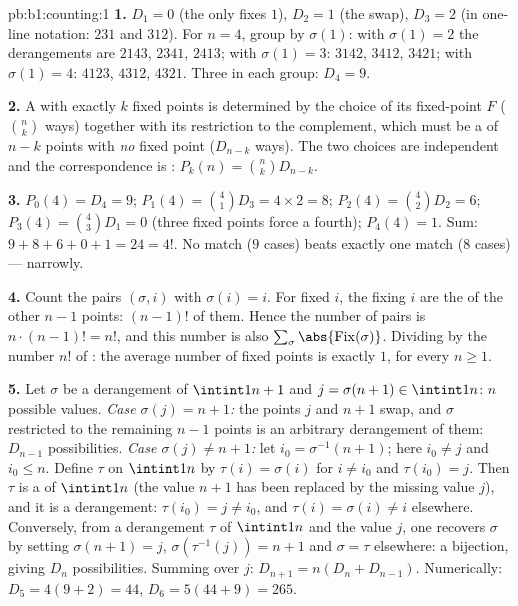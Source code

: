 \begin{solution}{pb:b1:counting:1}
\textbf{1.} $D_1 = 0$ (the only  fixes $1$), $D_2 = 1$
(the swap), $D_3 = 2$ (in one-line notation: $231$ and $312$). For
$n = 4$, group by $\sigma(1)$: with $\sigma(1) = 2$ the derangements
are $2143$, $2341$, $2413$; with $\sigma(1) = 3$: $3142$, $3412$,
$3421$; with $\sigma(1) = 4$: $4123$, $4312$, $4321$. Three in each
group: $D_4 = 9$.

\textbf{2.} A  with exactly $k$ fixed points is
determined by the choice of its fixed-point  $F$ ($\binom nk$
ways) together with its restriction to the complement, which must
be a  of $n - k$ points with \emph{no} fixed point
($D_{n-k}$ ways). The two choices are independent and the
correspondence is : $P_k(n) = \binom nk D_{n-k}$.

\textbf{3.} $P_0(4) = D_4 = 9$; $P_1(4) = \binom41 D_3 = 4 \times 2
= 8$; $P_2(4) = \binom42 D_2 = 6$; $P_3(4) = \binom43 D_1 = 0$
(three fixed points force a fourth); $P_4(4) = 1$. Sum: $9 + 8 + 6
+ 0 + 1 = 24 = 4!$. No match ($9$ cases) beats exactly one match
($8$ cases) --- narrowly.

\textbf{4.} Count the pairs $(\sigma, i)$ with $\sigma(i) = i$. For
fixed $i$, the  fixing $i$ are the  of the
other $n - 1$ points: $(n-1)!$ of them. Hence the number of pairs
is $n \cdot (n-1)! = n!$, and this number is also
$\sum_\sigma \abs{\mathrm{Fix}(\sigma)}$. Dividing by the number
$n!$ of : the average number of fixed points is
exactly $1$, for every $n \geq 1$.

\textbf{5.} Let $\sigma$ be a derangement of $\intint1{n+1}$ and
$j = \sigma(n+1) \in \intint1n$: $n$ possible values. \emph{Case
$\sigma(j) = n+1$:} the points $j$ and $n+1$ swap, and $\sigma$
restricted to the remaining $n - 1$ points is an arbitrary
derangement of them: $D_{n-1}$ possibilities. \emph{Case $\sigma(j)
\neq n+1$:} let $i_0 = \sigma^{-1}(n+1)$; here $i_0 \neq j$ and
$i_0 \leq n$. Define $\tau$ on $\intint1n$ by $\tau(i) = \sigma(i)$
for $i \neq i_0$ and $\tau(i_0) = j$. Then $\tau$ is a 
of $\intint1n$ (the value $n+1$ has been replaced by the missing
value $j$), and it is a derangement: $\tau(i_0) = j \neq i_0$, and
$\tau(i) = \sigma(i) \neq i$ elsewhere. Conversely, from a
derangement $\tau$ of $\intint1n$ and the value $j$, one recovers
$\sigma$ by setting $\sigma(n+1) = j$, $\sigma(\tau^{-1}(j)) = n+1$
and $\sigma = \tau$ elsewhere: a bijection, giving $D_n$
possibilities. Summing over $j$: $D_{n+1} = n(D_n + D_{n-1})$.
Numerically: $D_5 = 4(9 + 2) = 44$, $D_6 = 5(44 + 9) = 265$.


\end{solution}
